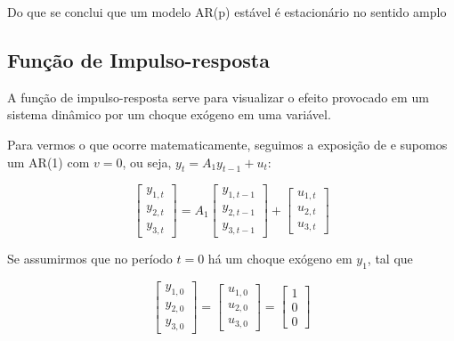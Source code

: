 \documentclass[a4paper,
               article,
               12pt,
               openany,
               oneside,
               english,
               brazil]{abntex2}
\numberwithin{equation}{section}
\begin{document}
    Do que se conclui que um modelo AR(p) estável é estacionário no sentido amplo \cite[p.~15-16]{lutkepool}

    \subsection{Função de Impulso-resposta}

    A função de impulso-resposta serve para visualizar o efeito provocado em um sistema dinâmico por um choque exógeno em uma variável.

    Para vermos o que ocorre matematicamente, seguimos a exposição de \textcite[p.~51-53]{lutkepool} e supomos um AR(1) com $ v = 0 $, ou seja, $ y_t = A_1 y_{t-1} + u_t $:

    \begin{equation*}
        \begin{bmatrix}
            y_{1,t} \\
            y_{2,t} \\
            y_{3,t}
        \end{bmatrix} =
        A_1
        \begin{bmatrix}
            y_{1,t-1} \\
            y_{2,t-1} \\
            y_{3,t-1}
        \end{bmatrix} +
        \begin{bmatrix}
            u_{1,t} \\
            u_{2,t} \\
            u_{3,t}
        \end{bmatrix}
    \end{equation*}

    Se assumirmos que no período $ t = 0 $ há um choque exógeno em $ y_1 $, tal que

    \begin{equation*}
        \begin{bmatrix}
            y_{1,0} \\
            y_{2,0} \\
            y_{3,0}
        \end{bmatrix} =
        \begin{bmatrix}
            u_{1,0} \\
            u_{2,0} \\
            u_{3,0}
        \end{bmatrix} =
        \begin{bmatrix}
            1 \\
            0 \\
            0
        \end{bmatrix}
    \end{equation*}
\end{document}
